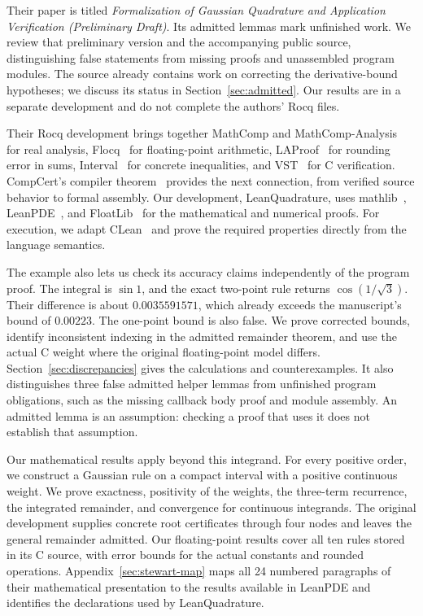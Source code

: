 \documentclass[11pt]{article}
\begin{document}
Their paper is titled \emph{Formalization of Gaussian Quadrature and
Application Verification (Preliminary Draft)}. Its admitted lemmas mark
unfinished work. We review that preliminary version and the accompanying
public source, distinguishing false statements from missing proofs and
unassembled program modules. The source already contains work on correcting
the derivative-bound hypotheses; we discuss its status in
Section~\ref{sec:admitted}. Our results are in a separate development and
do not complete the authors' Rocq files.

Their Rocq development brings together MathComp and
MathComp-Analysis~\cite{mathcomp,mathcompanalysis} for real analysis,
Flocq~\cite{flocq} for floating-point arithmetic, LAProof~\cite{laproof}
for rounding error in sums, Interval~\cite{interval} for concrete
inequalities, and VST~\cite{vstfloyd} for C verification. CompCert's
compiler theorem~\cite{compcert} provides the next connection, from
verified source behavior to formal assembly. Our development,
LeanQuadrature, uses mathlib~\cite{mathlib}, LeanPDE~\cite{leanpde}, and
FloatLib~\cite{floatlib} for the mathematical and numerical proofs. For
execution, we adapt CLean~\cite{clean} and prove the required properties
directly from the language semantics.

The example also lets us check its accuracy claims independently of the
program proof. The integral is $\sin1$, and the exact two-point rule
returns $\cos(1/\sqrt3)$. Their difference is about $0.0035591571$, which
already exceeds the manuscript's bound of $0.00223$. The one-point bound
is also false. We prove corrected bounds, identify inconsistent indexing
in the admitted remainder theorem, and use the actual C weight where the
original floating-point model differs. Section~\ref{sec:discrepancies}
gives the calculations and counterexamples. It also distinguishes three
false admitted helper lemmas from unfinished program obligations, such as
the missing callback body proof and module assembly. An admitted lemma is an assumption:
checking a proof that uses it does not establish that assumption.

Our mathematical results apply beyond this integrand. For every positive
order, we construct a Gaussian rule on a compact interval with a positive
continuous weight. We prove exactness, positivity of the weights, the
three-term recurrence, the integrated remainder, and convergence for
continuous integrands. The original development supplies concrete root
certificates through four nodes and leaves the general remainder admitted.
Our floating-point results cover all ten rules stored in its C source,
with error bounds for the actual constants and rounded operations.
Appendix~\ref{sec:stewart-map} maps all 24 numbered paragraphs of their
mathematical presentation to the results available in LeanPDE and identifies
the declarations used by LeanQuadrature.
\end{document}
